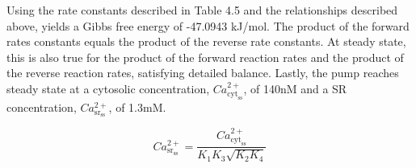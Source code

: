 \documentclass[12pt]{ucsddissertation}
\begin{document}
Using the rate constants described in Table 4.5 and the relationships described above, yields a Gibbs free energy of -47.0943 kJ/mol. The product of the forward rates constants equals the product of the reverse rate constants. At steady state, this is also true for the product of the forward reaction rates and the product of the reverse reaction rates, satisfying detailed balance. Lastly, the pump reaches steady state at a cytosolic concentration, $Ca^{2+}_{ \mathrm { cyt } _ { \mathrm { ss } } }$, of 140nM and a SR concentration, $Ca^{2+} _ { \mathrm { sr } _ { \mathrm { ss } } } $, of 1.3mM.

\begin{equation}
Ca^{2+} _ { \mathrm { sr } _ { \mathrm { ss } } } = \frac {Ca^{2+}_{ \mathrm { cyt } _ { \mathrm { ss } } } } { K _ { 1 } K _ { 3 } \sqrt { K _ { 2 } K _ { 4 } } }
\end{equation}
\end{document}
